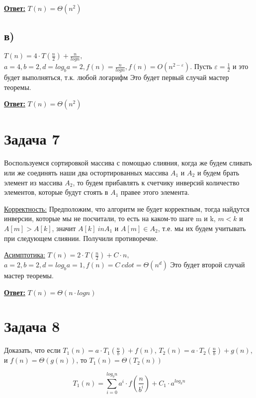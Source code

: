 \documentclass[a4paper,14pt]{article} %
\begin{document}
\underline{\textbf{Ответ:}} $T(n) = \Theta(n^2)$

\subsection{в)}
$T(n) = 4 \cdot T(\frac{n}{2}) + \frac{n}{logn},$
\newline
$a = 4, b = 2, d = log_b a = 2, f(n) = \frac{n}{logn}, f(n) = O(n^{2 - \varepsilon})$. 
\newline
Пусть $\varepsilon = \frac{1}{2}$ и это будет выполняться, т.к. любой логарифм
\newline
Это будет первый случай мастер теоремы.

\underline{\textbf{Ответ:}} $T(n) = \Theta(n^2)$

\section{Задача 7}
Воспользуемся сортировкой массива с помощью слияния, когда же будем сливать или же соединять наши два остортированных массива $A_1$ и $A_2$ и будем брать элемент из массива $A_2$, 
то будем прибавлять к счетчику инверсий количество элементов, которые будут стоять в $A_1$ правее этого элемента.

\underline{Корректность:} Предположим, что алгоритм не будет корректным, тогда найдутся инверсии, которые мы не посчитали,
то есть на каком-то шаге m и k, $m < k$ и $A[m] > A[k]$, значит $A[k] \ in A_1$ и $A[m] \in A_2$, т.е. мы их будем учитывать при следующем слиянии. Получили противоречие.

\underline{Асимптотика:} $T(n) = 2 \cdot T(\frac{n}{2}) + C \cdot n,$
\newline
$a = 2, b = 2, d = log_b a = 1, f(n) = C \ cdot = \Theta(n^d)$
\newline
Это будет второй случай мастер теоремы.

\underline{\textbf{Ответ:}} $T(n) = \Theta(n\cdot logn)$

\section{Задача 8}
Доказать, что если $T_1(n) = a \cdot T_1(\frac{n}{b}) + f(n)$, $T_2(n) = a \cdot T_2(\frac{n}{b}) + g(n)$, и $f(n) = \Theta(g(n))$, то
$T_1(n) = \Theta(T_2(n))$

\begin{equation*}
T_1(n) = \sum_{i = 0}^{log_b n} a^i \cdot f(\frac{n}{b^i}) + C_1 \cdot a^{log_b n}
\end{equation*}
\end{document}
